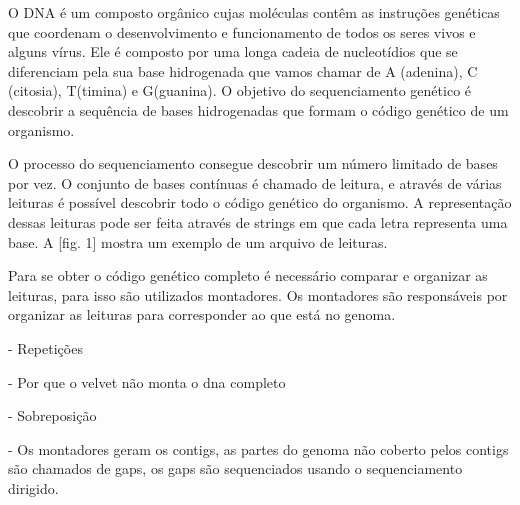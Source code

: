O DNA é um composto orgânico cujas moléculas contêm as instruções genéticas
 que coordenam o desenvolvimento e funcionamento de todos os seres vivos e alguns vírus.
Ele é composto por uma longa cadeia de nucleotídios que se diferenciam pela sua base hidrogenada
que vamos chamar de A (adenina), C (citosia), T(timina) e G(guanina). O objetivo do sequenciamento
genético é descobrir a sequência de bases hidrogenadas que formam o código genético de um organismo.

O processo do sequenciamento consegue descobrir um número limitado de bases por vez. O conjunto de bases
contínuas é chamado de leitura, e através de várias leituras é possível descobrir todo o código genético
do organismo. A representação dessas leituras pode ser feita através de strings em que cada letra representa uma base.
A [fig. 1] mostra um exemplo de um arquivo de leituras.

Para se obter o código genético completo é necessário comparar e organizar as leituras, para isso são utilizados
montadores. Os montadores são responsáveis por organizar as leituras para corresponder ao que está no genoma.




- Repetições

- Por que o velvet não monta o dna completo

- Sobreposição

- Os montadores geram os contigs, as partes do genoma não coberto pelos contigs são chamados de gaps, os gaps são sequenciados usando o sequenciamento dirigido.



